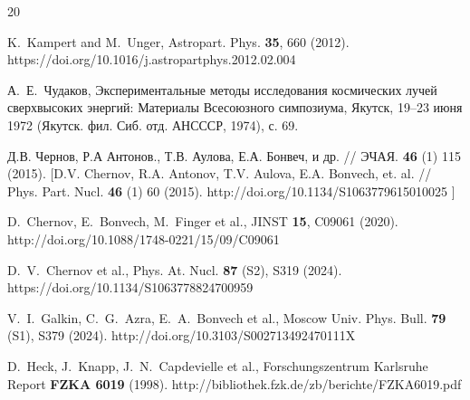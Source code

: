 \documentclass[aps,preprint,showpacs,aps,amsmath,showkeys,nobibnotes,nofootinbib,footnotes,superscriptaddress]{revtex4-2}
\begin{document}
\begin{thebibliography}{20}

K.~Kampert and M.~Unger, Astropart. Phys. \textbf{35}, 660 (2012).
\\ https://doi.org/10.1016/j.astropartphys.2012.02.004

        
А.~Е.~Чудаков, Экспериментальные методы исследования космических лучей сверхвысоких энергий: Материалы Всесоюзного симпозиума,
Якутск, 19–23 июня 1972 (Якутск. фил. Сиб. отд. АНСССР, 1974), с. 69.

Д.В. Чернов, Р.А Антонов., Т.В. Аулова, Е.А. Бонвеч, и др. // ЭЧАЯ. \textbf{46} (1) 115 (2015). [D.V. Chernov, R.A. Antonov, T.V. Aulova, E.A. Bonvech, et. al. // Phys. Part. Nucl. \textbf{46} (1) 60 (2015). http://doi.org/10.1134/S1063779615010025 ]


D.~Chernov, E.~Bonvech, M.~Finger et al., JINST \textbf{15}, C09061 (2020).
\\ http://doi.org/10.1088/1748-0221/15/09/C09061


D.~V.~Chernov et al., Phys. At. Nucl. \textbf{87} (S2), S319 (2024).
\\ https://doi.org/10.1134/S1063778824700959


V.~I.~Galkin, C.~G.~Azra, E.~A.~Bonvech et al., 
Moscow Univ. Phys. Bull. \textbf{79} (S1), S379 (2024).
http://doi.org/10.3103/S002713492470111X


D.~Heck, J.~Knapp, J.~N.~Capdevielle et al., 
Forschungszentrum Karlsruhe Report \textbf{FZKA 6019} (1998).
http://bibliothek.fzk.de/zb/berichte/FZKA6019.pdf



\end{thebibliography}
\end{document}
